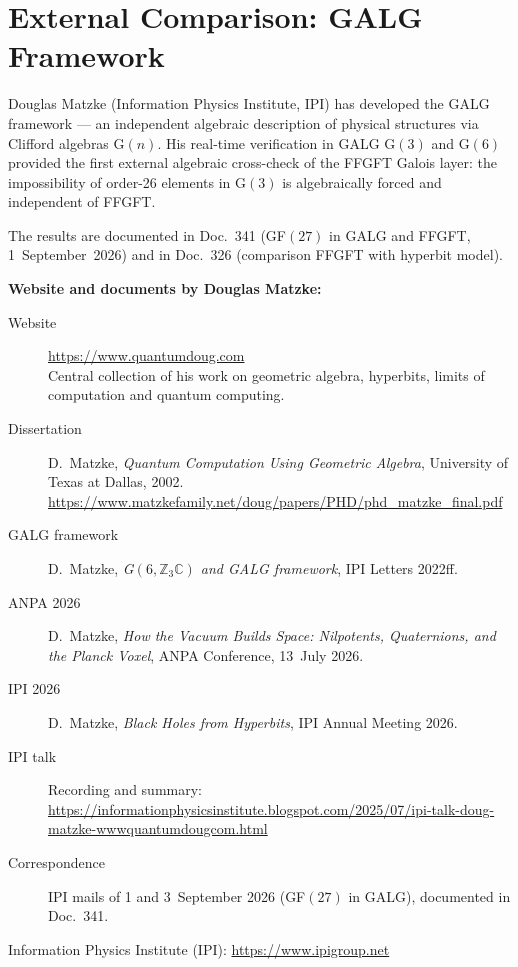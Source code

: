 \documentclass[11pt,oneside]{book}
\begin{document}
\section*{External Comparison: GALG Framework}

Douglas Matzke (Information Physics Institute, IPI) has developed the GALG
framework — an independent algebraic description of physical structures via
Clifford algebras G$(n)$. His real-time verification in GALG G$(3)$ and G$(6)$
provided the first external algebraic cross-check of the FFGFT Galois layer:
the impossibility of order-26 elements in G$(3)$ is algebraically forced and
independent of FFGFT.

The results are documented in Doc.~341 (GF$(27)$ in GALG and FFGFT,
1~September~2026) and in Doc.~326 (comparison FFGFT with hyperbit model).

\medskip\noindent\textbf{Website and documents by Douglas Matzke:}
\begin{description}
  \item[Website] \url{https://www.quantumdoug.com}\\
    Central collection of his work on geometric algebra, hyperbits,
    limits of computation and quantum computing.
  \item[Dissertation] D.~Matzke, \textit{Quantum Computation Using Geometric Algebra},
    University of Texas at Dallas, 2002.\\
    \url{https://www.matzkefamily.net/doug/papers/PHD/phd_matzke_final.pdf}
  \item[GALG framework] D.~Matzke, \textit{G$(6,\mathbb{Z}_3\mathbb{C})$ and GALG framework},
    IPI Letters 2022ff.
  \item[ANPA 2026] D.~Matzke, \textit{How the Vacuum Builds Space: Nilpotents,
    Quaternions, and the Planck Voxel}, ANPA Conference, 13~July 2026.
  \item[IPI 2026] D.~Matzke, \textit{Black Holes from Hyperbits}, IPI Annual Meeting 2026.
  \item[IPI talk] Recording and summary:\\
    \url{https://informationphysicsinstitute.blogspot.com/2025/07/ipi-talk-doug-matzke-wwwquantumdougcom.html}
  \item[Correspondence] IPI mails of 1 and 3~September 2026 (GF$(27)$ in GALG),
    documented in Doc.~341.
\end{description}

Information Physics Institute (IPI): \url{https://www.ipigroup.net}
\end{document}
